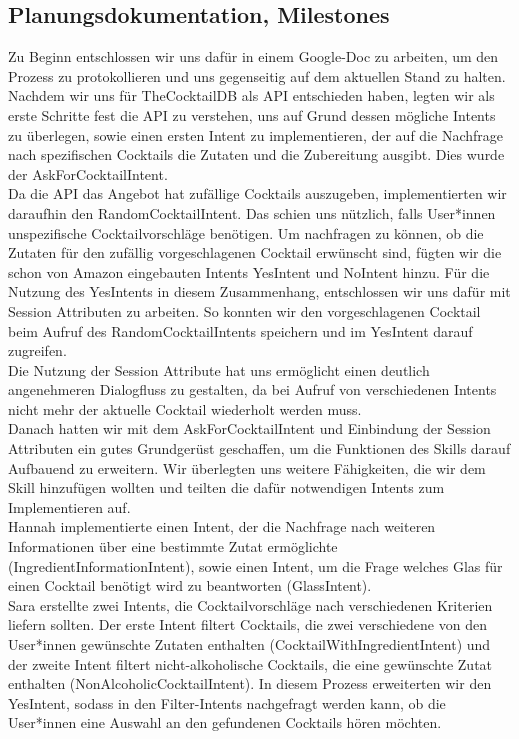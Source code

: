 \documentclass[12pt,letterpaper]{article}
\begin{document}
\subsection{Planungsdokumentation, Milestones}
Zu Beginn entschlossen wir uns dafür in einem Google-Doc zu arbeiten, um den Prozess zu protokollieren und uns gegenseitig auf dem aktuellen Stand zu halten. \\ Nachdem wir uns für TheCocktailDB als API entschieden haben, legten wir als erste Schritte fest die API zu verstehen, uns auf Grund dessen mögliche Intents zu überlegen, sowie einen ersten Intent zu implementieren, der auf die Nachfrage nach spezifischen Cocktails die Zutaten und die Zubereitung ausgibt. Dies wurde der AskForCocktailIntent. \\
Da die API das Angebot hat zufällige Cocktails auszugeben, implementierten wir daraufhin den RandomCocktailIntent. Das schien uns nützlich, falls User*innen unspezifische Cocktailvorschläge benötigen. Um nachfragen zu können, ob die Zutaten für den zufällig vorgeschlagenen Cocktail erwünscht sind, fügten wir die schon von Amazon eingebauten Intents YesIntent und NoIntent hinzu. Für die Nutzung des YesIntents in diesem Zusammenhang, entschlossen wir uns dafür mit Session Attributen zu arbeiten. So konnten wir den vorgeschlagenen Cocktail beim Aufruf des RandomCocktailIntents speichern und im YesIntent darauf zugreifen.\\ Die Nutzung der Session Attribute hat uns ermöglicht einen deutlich angenehmeren Dialogfluss zu gestalten, da bei Aufruf von verschiedenen Intents nicht mehr der aktuelle Cocktail wiederholt werden muss. \\
Danach hatten wir mit dem AskForCocktailIntent und Einbindung der Session Attributen ein gutes Grundgerüst geschaffen, um die Funktionen des Skills darauf Aufbauend zu erweitern. Wir überlegten uns weitere Fähigkeiten, die wir dem Skill hinzufügen wollten und teilten die dafür notwendigen Intents zum Implementieren auf. \\ Hannah implementierte einen Intent, der die Nachfrage nach weiteren Informationen über eine bestimmte Zutat ermöglichte (IngredientInformationIntent), sowie einen Intent, um die Frage welches Glas für einen Cocktail benötigt wird zu beantworten (GlassIntent). \\ Sara erstellte zwei Intents, die Cocktailvorschläge nach verschiedenen Kriterien liefern sollten. Der erste Intent filtert Cocktails, die zwei verschiedene von den User*innen gewünschte Zutaten enthalten (CocktailWithIngredientIntent) und der zweite Intent filtert nicht-alkoholische Cocktails, die eine gewünschte Zutat enthalten (NonAlcoholicCocktailIntent). In diesem Prozess erweiterten wir den YesIntent, sodass in den Filter-Intents nachgefragt werden kann, ob die User*innen eine Auswahl an den gefundenen Cocktails hören möchten. \\
\end{document}

